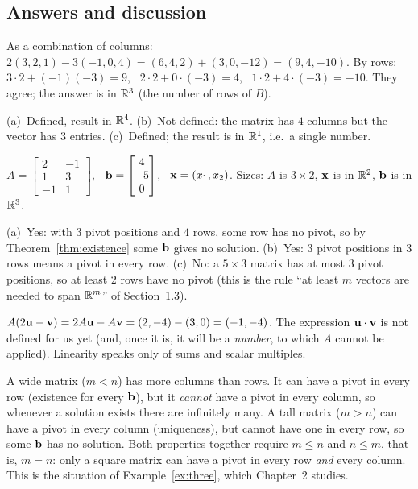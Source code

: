 \documentclass[11pt]{article}
\begin{document}
\subsection*{Answers and discussion}
\begin{description}[leftmargin=0pt,itemsep=5pt]
  \item[Knowledge Check \ref{kc:twoways}.] As a combination of columns: $2(3,2,1)-3(-1,0,4)=(6,4,2)+(3,0,-12)=(9,4,-10)$. By rows: $3\cdot2+(-1)(-3)=9$, \ $2\cdot2+0\cdot(-3)=4$, \ $1\cdot2+4\cdot(-3)=-10$. They agree; the answer is in $\mathbb{R}^3$ (the number of rows of $B$).
  \item[Knowledge Check \ref{kc:defined}.] (a)~Defined, result in $\mathbb{R}^4$. (b)~Not defined: the matrix has $4$ columns but the vector has $3$ entries. (c)~Defined; the result is in $\mathbb{R}^1$, i.e.\ a single number.
  \item[Knowledge Check \ref{kc:translate}.] $A=\begin{bmatrix}2&-1\\1&3\\-1&1\end{bmatrix}$, \ $\mathbf{b}=\begin{bmatrix}4\\-5\\0\end{bmatrix}$, \ $\mathbf{x}=(x_1,x_2)$. Sizes: $A$ is $3\times2$, $\mathbf{x}$ is in $\mathbb{R}^2$, $\mathbf{b}$ is in $\mathbb{R}^3$.
  \item[Knowledge Check \ref{kc:apply}.] (a)~Yes: with $3$ pivot positions and $4$ rows, some row has no pivot, so by Theorem~\ref{thm:existence} some $\mathbf{b}$ gives no solution. (b)~Yes: $3$ pivot positions in $3$ rows means a pivot in every row. (c)~No: a $5\times3$ matrix has at most $3$ pivot positions, so at least $2$ rows have no pivot (this is the rule ``at least $m$ vectors are needed to span $\mathbb{R}^m$'' of Section~1.3).
  \item[Knowledge Check \ref{kc:uselinear}.] $A(2\mathbf{u}-\mathbf{v})=2A\mathbf{u}-A\mathbf{v}=(2,-4)-(3,0)=(-1,-4)$. The expression $\mathbf{u}\cdot\mathbf{v}$ is not defined for us yet (and, once it is, it will be a \emph{number}, to which $A$ cannot be applied). Linearity speaks only of sums and scalar multiples.
  \item[Pause and think \ref{think:rowscols}.] A wide matrix ($m<n$) has more columns than rows. It can have a pivot in every row (existence for every $\mathbf{b}$), but it \emph{cannot} have a pivot in every column, so whenever a solution exists there are infinitely many. A tall matrix ($m>n$) can have a pivot in every column (uniqueness), but cannot have one in every row, so some $\mathbf{b}$ has no solution. Both properties together require $m\le n$ and $n\le m$, that is, $m=n$: only a square matrix can have a pivot in every row \emph{and} every column. This is the situation of Example~\ref{ex:three}, which Chapter~2 studies.

\end{description}
\end{document}
